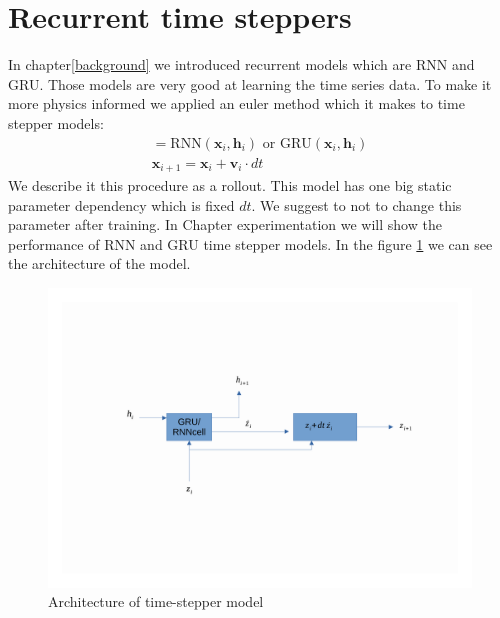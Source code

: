 \section{Recurrent time steppers}
In chapter\ref{background}  we introduced recurrent models which are RNN and GRU.
Those models are very good at learning the time series data. To make it more physics informed we applied an euler method which it makes to time stepper models:
\begin{eqnarray}
	[\mathbf{v}_i, \mathbf{h}_{i+1}] = \text{RNN}(\mathbf{x}_i,\mathbf{h}_i) \text{  or  }  \text{GRU}(\mathbf{x}_i,\mathbf{h}_i)\\
	\mathbf{x}_{i+1} = \mathbf{x}_i + \mathbf{v}_i \cdot dt
\end{eqnarray}
We describe it this procedure as a rollout. 
This model has one big static parameter dependency which is fixed $dt$. We suggest to not to change this parameter after training. In Chapter experimentation we will show the performance of RNN and GRU time stepper models. In the figure \ref{fig:rnn} we can see the architecture of the model.
\begin{figure}[h!]
	\includegraphics[width=15cm]{chapters/chapter4/RNN_stepper}
	
	\caption{Architecture of time-stepper model}
	\label{fig:rnn}
\end{figure}



